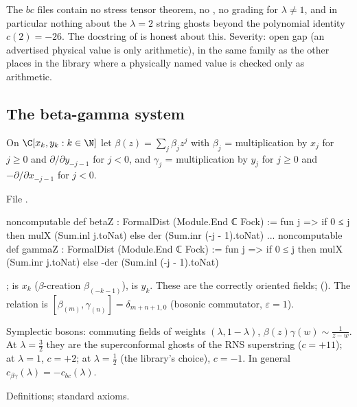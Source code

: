 \begin{warning}[title={Finding (F6): what the bc files do not contain}]
The $bc$ files contain no stress tensor theorem, no , no grading for $\lambda\neq1$,
and in particular nothing about the $\lambda=2$ string ghosts beyond the polynomial identity
$c(2)=-26$. The docstring of  is honest about this. Severity: open gap (an
advertised physical value is only arithmetic), in the same family as the other places in the library where a physically named
value is checked only as arithmetic.
\end{warning}

\subsection{The beta-gamma system}\label{l17:sec:bg}

\begin{definition}\label{l17:def:bg}
On $\C[x_k,y_k:k\in\N]$ let $\beta(z)=\sum_j\beta_jz^j$ with $\beta_j$ = multiplication by $x_j$ for
$j\ge0$ and $\partial/\partial y_{-j-1}$ for $j<0$, and $\gamma_j$ = multiplication by $y_j$ for $j\ge0$
and $-\partial/\partial x_{-j-1}$ for $j<0$.
\end{definition}
\noindent File .
\begin{leancode}
noncomputable def betaZ : FormalDist (Module.End ℂ Fock) :=
  fun j => if 0 ≤ j then mulX (Sum.inl j.toNat) else der (Sum.inr (-j - 1).toNat)
...
noncomputable def gammaZ : FormalDist (Module.End ℂ Fock) :=
  fun j => if 0 ≤ j then mulX (Sum.inr j.toNat) else -der (Sum.inl (-j - 1).toNat)
\end{leancode}
\begin{dictionary}
;  is $x_k$ ($\beta$-creation $\beta_{(-k-1)}$),
 is $y_k$. These are the correctly oriented fields; 
(). The relation is $[\beta_{(m)},\gamma_{(n)}]=\delta_{m+n+1,0}$ (bosonic commutator,
$\varepsilon=1$).
\end{dictionary}
\begin{physics}
Symplectic bosons: commuting fields of weights $(\lambda,1-\lambda)$, $\beta(z)\gamma(w)\sim\frac{1}{z-w}$.
At $\lambda=\frac32$ they are the superconformal ghosts of the RNS superstring ($c=+11$); at
$\lambda=1$, $c=+2$; at $\lambda=\frac12$ (the library's choice), $c=-1$. In general
$c_{\beta\gamma}(\lambda)=-c_{bc}(\lambda)$.
\end{physics}
\begin{status}
Definitions; standard axioms.
\end{status}

